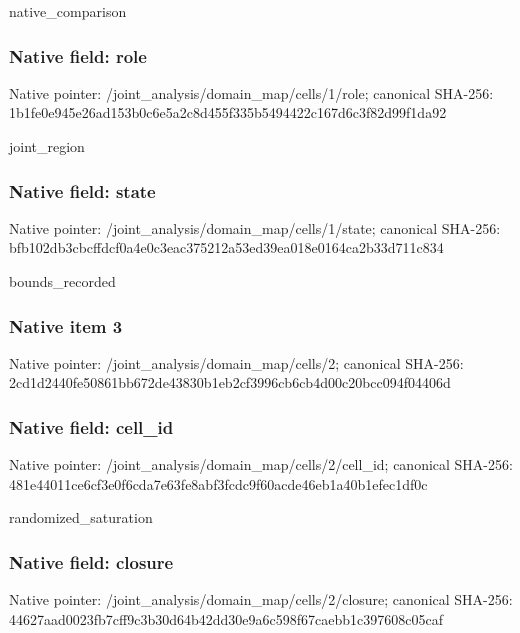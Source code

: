 \documentclass[10pt,a4paper]{article}
\begin{document}
\begingroup\raggedright\sloppy native\_\allowbreak{}comparison\par\endgroup

\subsubsection{Native field: role}
Native pointer: /joint\_\allowbreak{}analysis/domain\_\allowbreak{}map/cells/1/role; canonical SHA-256: 1b1fe0e945e26ad153b0c6e5a2c8d455f335b5494422c167d6c3f82d99f1da92

\begingroup\raggedright\sloppy joint\_\allowbreak{}region\par\endgroup

\subsubsection{Native field: state}
Native pointer: /joint\_\allowbreak{}analysis/domain\_\allowbreak{}map/cells/1/state; canonical SHA-256: bfb102db3cbcffdcf0a4e0c3eac375212a53ed39ea018e0164ca2b33d711c834

\begingroup\raggedright\sloppy bounds\_\allowbreak{}recorded\par\endgroup

\subsubsection{Native item 3}
Native pointer: /joint\_\allowbreak{}analysis/domain\_\allowbreak{}map/cells/2; canonical SHA-256: 2cd1d2440fe50861bb672de43830b1eb2cf3996cb6cb4d00c20bcc094f04406d

\subsubsection{Native field: cell\_\allowbreak{}id}
Native pointer: /joint\_\allowbreak{}analysis/domain\_\allowbreak{}map/cells/2/cell\_\allowbreak{}id; canonical SHA-256: 481e44011ce6cf3e0f6cda7e63fe8abf3fcdc9f60acde46eb1a40b1efec1df0c

\begingroup\raggedright\sloppy randomized\_\allowbreak{}saturation\par\endgroup

\subsubsection{Native field: closure}
Native pointer: /joint\_\allowbreak{}analysis/domain\_\allowbreak{}map/cells/2/closure; canonical SHA-256: 44627aad0023fb7cff9c3b30d64b42dd30e9a6c598f67caebb1c397608c05caf
\end{document}
